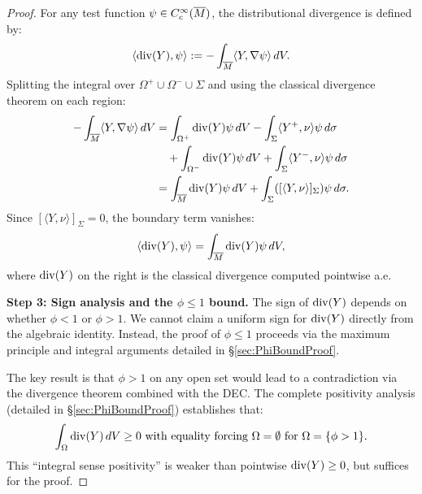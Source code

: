 \begin{proof}
For any test function $\psi \in C^\infty_c(\overline{M})$, the distributional divergence is defined by:
\begin{equation}
    \langle \mathrm{div}(Y), \psi \rangle := -\int_{\overline{M}} \langle Y, \nabla \psi \rangle \, dV.
\end{equation}
Splitting the integral over $\Omega^+ \cup \Omega^- \cup \Sigma$ and using the classical divergence theorem on each region:
\begin{align}
    -\int_{\overline{M}} \langle Y, \nabla \psi \rangle \, dV &= \int_{\Omega^+} \mathrm{div}(Y) \psi \, dV - \int_\Sigma \langle Y^+, \nu \rangle \psi \, d\sigma \\
    &\quad + \int_{\Omega^-} \mathrm{div}(Y) \psi \, dV + \int_\Sigma \langle Y^-, \nu \rangle \psi \, d\sigma \\
    &= \int_{\overline{M}} \mathrm{div}(Y) \psi \, dV + \int_\Sigma ([\langle Y, \nu \rangle]_\Sigma) \psi \, d\sigma.
\end{align}
Since $[\langle Y, \nu \rangle]_\Sigma = 0$, the boundary term vanishes:
\begin{equation}
    \langle \mathrm{div}(Y), \psi \rangle = \int_{\overline{M}} \mathrm{div}(Y) \psi \, dV,
\end{equation}
where $\mathrm{div}(Y)$ on the right is the classical divergence computed pointwise a.e.

\textbf{Step 3: Sign analysis and the $\phi \le 1$ bound.}
The sign of $\mathrm{div}(Y)$ depends on whether $\phi < 1$ or $\phi > 1$. We cannot claim a uniform sign for $\mathrm{div}(Y)$ directly from the algebraic identity. Instead, the proof of $\phi \le 1$ proceeds via the maximum principle and integral arguments detailed in \S\ref{sec:PhiBoundProof}.

The key result is that $\phi > 1$ on any open set would lead to a contradiction via the divergence theorem combined with the DEC. The complete positivity analysis (detailed in \S\ref{sec:PhiBoundProof}) establishes that:
\begin{equation}\label{eq:DivYIntegralSense}
    \int_\Omega \mathrm{div}(Y) \, dV \ge 0 \text{ with equality forcing } \Omega = \emptyset \text{ for } \Omega = \{\phi > 1\}.
\end{equation}
This ``integral sense positivity'' is weaker than pointwise $\mathrm{div}(Y) \ge 0$, but suffices for the proof.
\end{proof}

